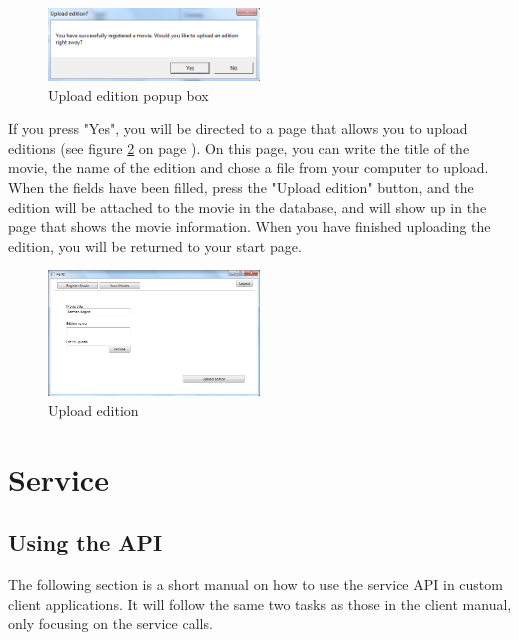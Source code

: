 \begin{figure}[h!]  
  \centering
\includegraphics[width=0.5\textwidth]{Parts/Images/Manual/RegisterPopup}
\caption{Upload edition popup box}
\label{fig:Manual_Client_Navigation_Upload_Popup}
\end{figure}

If you press "Yes", you will be directed to a page that allows you to upload editions (see figure \ref{fig:Manual_Client_Navigation_Upload_Edition} on page \pageref{fig:Manual_Client_Navigation_Upload_Edition}). On this page, you can write the title of the movie, the name of the edition and chose a file from your computer to upload. When the fields have been filled, press the "Upload edition" button, and the edition will be attached to the movie in the database, and will show up in the page that shows the movie information. When you have finished uploading the edition, you will be returned to your start page.

\begin{figure}[h!]  
  \centering
\includegraphics[width=0.5\textwidth]{Parts/Images/Manual/CPUploadEdition}
\caption{Upload edition}
\label{fig:Manual_Client_Navigation_Upload_Edition}
\end{figure}

\section{Service}
\label{Manual_Service}

\subsection{Using the API}
\label{Manual_Service_Usage}
The following section is a short manual on how to use the service API in custom client applications. It will follow the same two tasks as those in the client manual, only focusing on the service calls.

